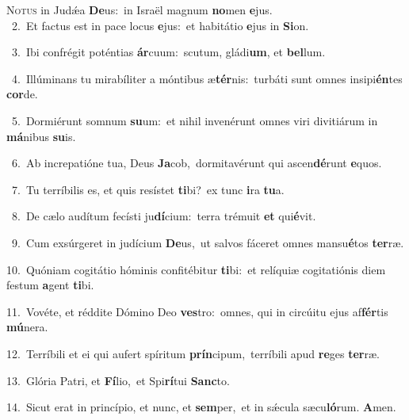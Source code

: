 \lettrine{\initial\textcolor{\initialcolor}{N}}{otus} in Judǽa \textbf{De}\-us:~\star in Israël magnum \textbf{no}\-men \textbf{e}\-jus.\\
{\numbfont\textcolor{\numbcolor}{~2.}}~Et factus est in pace locus \textbf{e}\-jus:~\star et habitátio \textbf{e}\-jus in \textbf{Si}\-on.\par
{\numbfont\textcolor{\numbcolor}{~3.}}~Ibi confrégit poténtias \textbf{ár}\-cuum:~\star scutum, gládi\-\textbf{um}\-, et \textbf{bel}\-lum.\par
{\numbfont\textcolor{\numbcolor}{~4.}}~Illúminans tu mirabíliter a móntibus æ\-\textbf{tér}\-nis:~\star turbáti sunt omnes insipi\-\textbf{én}\-tes \textbf{cor}\-de.\par
{\numbfont\textcolor{\numbcolor}{~5.}}~Dormiérunt somnum \textbf{su}\-um:~\star et nihil invenérunt omnes viri divitiárum in \textbf{má}\-nibus \textbf{su}\-is.\par
{\numbfont\textcolor{\numbcolor}{~6.}}~Ab increpatióne tua, Deus \textbf{Ja}\-cob,~\star dormitavérunt qui ascen\-\textbf{dé}\-runt \textbf{e}\-quos.\par
{\numbfont\textcolor{\numbcolor}{~7.}}~Tu terríbilis es, et quis resístet \textbf{ti}\-bi?~\star ex tunc \textbf{i}\-ra \textbf{tu}\-a.\par
{\numbfont\textcolor{\numbcolor}{~8.}}~De cælo audítum fecísti ju\-\textbf{dí}\-cium:~\star terra trémuit \textbf{et} qui\-\textbf{é}\-vit.\par
{\numbfont\textcolor{\numbcolor}{~9.}}~Cum exsúrgeret in judícium \textbf{De}\-us,~\star ut salvos fáceret omnes mansu\-\textbf{é}\-tos \textbf{ter}\-ræ.\par
{\numbfont\textcolor{\numbcolor}{10.}}~Quóniam cogitátio hóminis confitébitur \textbf{ti}\-bi:~\star et relíquiæ cogitatiónis diem festum \textbf{a}\-gent \textbf{ti}\-bi.\par
{\numbfont\textcolor{\numbcolor}{11.}}~Vovéte, et réddite Dómino Deo \textbf{ves}\-tro:~\star omnes, qui in circúitu ejus af\-\textbf{fér}\-tis \textbf{mú}\-nera.\par
{\numbfont\textcolor{\numbcolor}{12.}}~Terríbili et ei qui aufert spíritum \textbf{prín}\-cipum,~\star terríbili apud \textbf{re}\-ges \textbf{ter}\-ræ.\par
{\numbfont\textcolor{\numbcolor}{13.}}~Glória Patri, et \textbf{Fí}\-lio,~\star et Spi\-\textbf{rí}\-tui \textbf{Sanc}\-to.\par
{\numbfont\textcolor{\numbcolor}{14.}}~Sicut erat in princípio, et nunc, et \textbf{sem}\-per,~\star et in sǽcula sæcu\-\textbf{ló}\-rum. \textbf{A}\-men.\par
